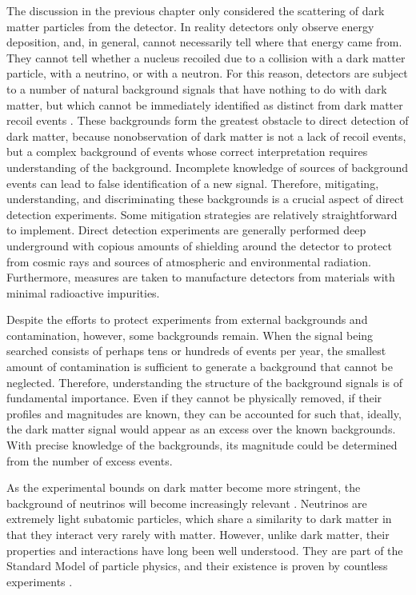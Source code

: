 \documentclass[b5paper, 10pt, twoside]{book}
\begin{document}
The discussion in the previous chapter only considered the scattering of dark matter particles from the detector. In reality detectors only observe energy deposition, and, in general, cannot necessarily tell where that energy came from. They cannot tell whether a nucleus recoiled due to a collision with a dark matter particle, with a neutrino, or with a neutron. For this reason, detectors are subject to a number of natural background signals that have nothing to do with dark matter, but which cannot be immediately identified as distinct from dark matter recoil events \parencite{BaxterEtAl2022}. These backgrounds form the greatest obstacle to direct detection of dark matter, because nonobservation of dark matter is not a lack of recoil events, but a complex background of events whose correct interpretation requires understanding of the background. Incomplete knowledge of sources of background events can lead to false identification of a new signal. Therefore, mitigating, understanding, and discriminating these backgrounds is a crucial aspect of direct detection experiments. Some mitigation strategies are relatively straightforward to implement. Direct detection experiments are generally performed deep underground with copious amounts of shielding around the detector to protect from cosmic rays and sources of atmospheric and environmental radiation. Furthermore, measures are taken to manufacture detectors from materials with minimal radioactive impurities.

Despite the efforts to protect experiments from external backgrounds and contamination, however, some backgrounds remain. When the signal being searched consists of perhaps tens or hundreds of events per year, the smallest amount of contamination is sufficient to generate a background that cannot be neglected. Therefore, understanding the structure of the background signals is of fundamental importance. Even if they cannot be physically removed, if their profiles and magnitudes are known, they can be accounted for such that, ideally, the dark matter signal would appear as an excess over the known backgrounds. With precise knowledge of the backgrounds, its magnitude could be determined from the number of excess events.

As the experimental bounds on dark matter become more stringent, the background of neutrinos will become increasingly relevant \parencites{OHare2016, GaspertGiampaMorrissey2022}. Neutrinos are extremely light subatomic particles, which share a similarity to dark matter in that they interact very rarely with matter. However, unlike dark matter, their properties and interactions have long been well understood. They are part of the Standard Model of particle physics, and their existence is proven by countless experiments \parencites{AharmimEtAl2013, AnEtAl2017, BasilicoEtAl2023, AbbasiEtAl2024, AbeEtAl2024, AbratenkoEtAl2024}. 
\end{document}
